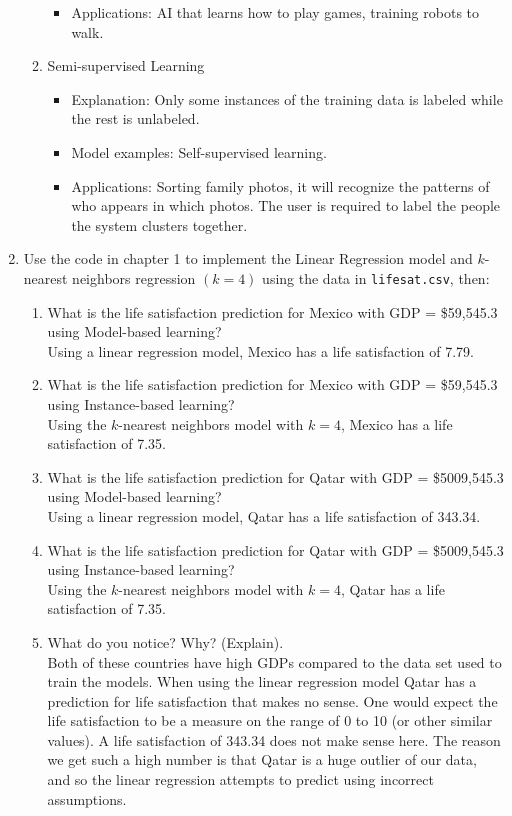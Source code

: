 \documentclass[a4paper,10pt]{article}
\begin{document}
\begin{enumerate}
\begin{enumerate}
\begin{itemize}
			\item Applications:
			AI that learns how to play games, training robots to walk.
		\end{itemize}
		\item Semi-supervised Learning
		\begin{itemize}
			\item Explanation:
			Only some instances of the training data is labeled while the rest is unlabeled.
			\item Model examples:
			Self-supervised learning.
			\item Applications:
			Sorting family photos, it will recognize the patterns of who appears in which photos. The user is required to label the people the system clusters together.
		\end{itemize}
	\end{enumerate}
	
	\item Use the code in chapter 1 to implement the Linear Regression model and \( k \)-nearest neighbors regression \( (k=4) \) using the data in \texttt{lifesat.csv}, then:
	\begin{enumerate}
		\item What is the life satisfaction prediction for Mexico with GDP = \$59,545.3 using Model-based learning? \\
			Using a linear regression model, Mexico has a life satisfaction of 7.79.
			
		\item What is the life satisfaction prediction for Mexico with GDP = \$59,545.3 using Instance-based learning? \\
			Using the \( k \)-nearest neighbors model with \( k=4 \), Mexico has a life satisfaction of 7.35.
			
		\item What is the life satisfaction prediction for Qatar with GDP = \$5009,545.3 using Model-based learning? \\
			Using a linear regression model, Qatar has a life satisfaction of 343.34.
			
		\item What is the life satisfaction prediction for Qatar with GDP = \$5009,545.3
		using Instance-based learning? \\
			Using the \( k \)-nearest neighbors model with \( k=4 \), Qatar has a life satisfaction of 7.35.
			
		\item What do you notice? Why? (Explain). \\
			Both of these countries have high GDPs compared to the data set used to train the models.
			When using the linear regression model Qatar has a prediction for life satisfaction that makes no sense.
			One would expect the life satisfaction to be a measure on the range of 0 to 10 (or other similar values).
			A life satisfaction of 343.34 does not make sense here.
			The reason we get such a high number is that Qatar is a huge outlier of our data, and so the linear regression attempts to predict using incorrect assumptions.
			

\end{enumerate}
\end{enumerate}
\end{document}
